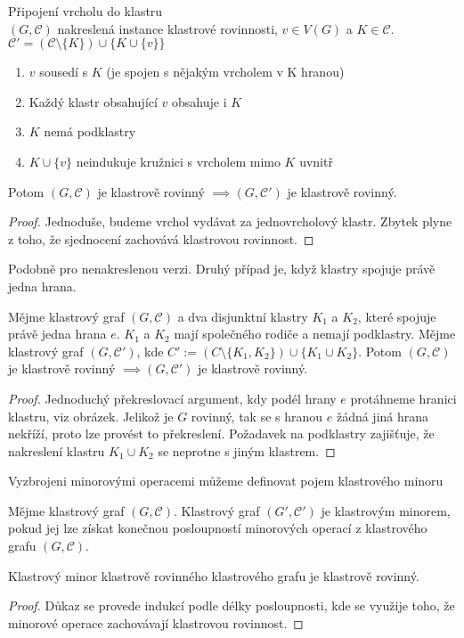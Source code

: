 \begin{tvr} Připojení vrcholu do klastru \\
$(G, \mathcal C)$ nakreslená instance klastrové rovinnosti, $v \in V(G)$ a $K \in \mathcal C$.\\
$\mathcal C' = (\mathcal C \setminus \{K\}) \cup \{ K \cup \{v\} \}$
\begin{enumerate}
\item $v$ sousedí s $K$ (je spojen s nějakým vrcholem v K hranou)
\item Každý klastr obsahující $v$ obsahuje i $K$
\item $K$ nemá podklastry
\item $K \cup \{v\}$ neindukuje kružnici s vrcholem mimo $K$ uvnitř
\end{enumerate}
Potom $(G, \mathcal C)$ je klastrově rovinný $\implies (G, \mathcal C')$ je klastrově rovinný.
\end{tvr}
\begin{proof}
Jednoduše, budeme vrchol vydávat za jednovrcholový klastr. Zbytek plyne z toho, že sjednocení zachovává klastrovou rovinnost.
\end{proof}

Podobně pro nenakreslenou verzi. Druhý případ je, když klastry spojuje právě jedna hrana. 
\begin{tvr}
Mějme klastrový graf  $(G, \mathcal C)$ a dva disjunktní klastry $K_1$ a $K_2$, které spojuje právě jedna hrana $e$. $K_1$ a $K_2$ mají společného rodiče a nemají podklastry. Mějme klastrový graf $(G, \mathcal C')$, kde  $C'  := (C\setminus \{K_1,K_2\}) \cup \{K_1 \cup K_2\}$. Potom $(G, \mathcal C)$ je klastrově rovinný $\implies (G, \mathcal C')$ je klastrově rovinný.
\end{tvr}
\begin{proof}
Jednoduchý překreslovací argument, kdy podél hrany $e$ protáhneme hranici klastru, viz obrázek. Jelikož je $G$ rovinný, tak se s hranou $e$ žádná jiná hrana nekříží, proto lze provést to překreslení. Požadavek na podklastry zajišťuje, že nakreslení klastru $K_1 \cup K_2$ se neprotne s jiným klastrem.
\end{proof}

Vyzbrojeni minorovými operacemi můžeme definovat pojem klastrového minoru

\begin{defn}
Mějme klastrový graf $(G,\mathcal C)$. Klastrový graf $(G',\mathcal C')$ je klastrovým minorem, pokud jej lze získat konečnou posloupností minorových operací z klastrového grafu $(G,\mathcal C)$.
\end{defn}

\begin{dusl} Klastrový minor klastrově rovinného klastrového grafu je klastrově rovinný.
\end{dusl}
\begin{proof}
Důkaz se provede indukcí podle délky posloupnosti, kde se využije toho, že minorové operace zachovávají klastrovou rovinnost.
\end{proof}